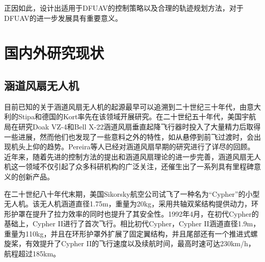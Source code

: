 正因如此，设计出适用于DFUAV的控制策略以及合理的轨迹规划方法，对于DFUAV的进一步发展具有重要意义。

\section{国内外研究现状}

\subsection{涵道风扇无人机}

目前已知的关于涵道风扇无人机的起源最早可以追溯到二十世纪三十年代，由意大利的Stipa和德国的Kort率先在该领域开展研究\cite{iiiNondimensionalModelingDuctedFan2012}。在二十世纪五十年代，美国宇航局在研究Doak VZ-4和Bell X-22涵道风扇垂直起降飞行器时投入了大量精力后取得一些进展，然而他们也发现了一些意料之外的特性，如从悬停到前飞过渡时，会出现机头上仰的趋势\cite{cookSummaryLiftLift1993}。Pereira等人\cite{pereiraHoverWindtunnelTesting2008}已经对涵道风扇早期的研究进行了详尽的回顾。近年来，随着先进的控制方法的提出和涵道风扇理论的进一步完善，涵道风扇无人机这一领域不仅引起了众多科研机构的广泛关注，还催生出了一系列具有里程碑意义的创新产品。

在二十世纪八十年代末期，美国Sikorsky航空公司试飞了一种名为“Cypher”的小型无人机。该无人机涵道直径1.75m，重量为20kg，采用共轴双桨结构提供动力，环形护罩在提升了拉力效率的同时也提升了其安全性。1992年4月，在初代Cypher的基础上，Cypher II进行了首次飞行。相比初代Cypher，Cypher II涵道直径1.9m，重量为110kg，并且在环形护罩外扩展了固定翼结构，并且尾部还有一个推进式螺旋桨，有效提升了Cypher II的飞行速度以及续航时间\cite{murphy1996air}，最高时速可达230km/h，航程超过185km。

